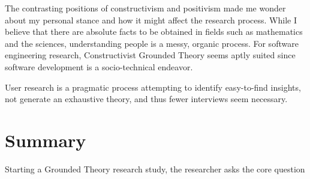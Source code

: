 The contrasting positions of constructivism and positivism made me wonder about my personal stance and how it might affect the research process. While I believe that there are absolute facts to be obtained in fields such as mathematics and the sciences, understanding people is a messy, organic process. For software engineering research, Constructivist Grounded Theory seems aptly suited since software development is a socio-technical endeavor.




User research is a pragmatic process attempting to identify easy-to-find insights, not generate an exhaustive theory, and thus fewer interviews seem necessary.



\section{Summary}
Starting a Grounded Theory research study, the researcher asks the core question   \cite{GlaserTheoreticalSensitivity}

